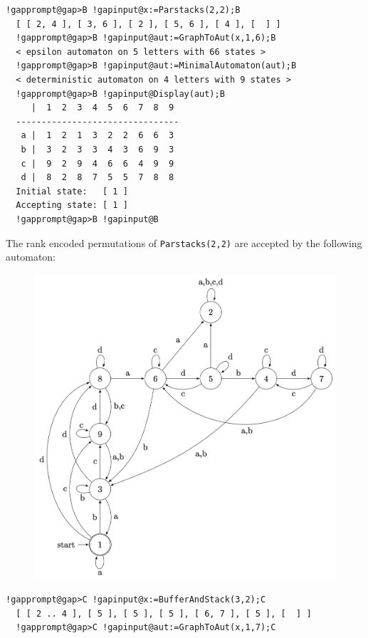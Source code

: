 \documentclass[a4paper,11pt]{report}
\begin{document}
{{{\begin{Verbatim}[commandchars=!@B,fontsize=\small,frame=single,label=Example]
  !gapprompt@gap>B !gapinput@x:=Parstacks(2,2);B
  [ [ 2, 4 ], [ 3, 6 ], [ 2 ], [ 5, 6 ], [ 4 ], [  ] ]
  !gapprompt@gap>B !gapinput@aut:=GraphToAut(x,1,6);B
  < epsilon automaton on 5 letters with 66 states >
  !gapprompt@gap>B !gapinput@aut:=MinimalAutomaton(aut);B
  < deterministic automaton on 4 letters with 9 states >
  !gapprompt@gap>B !gapinput@Display(aut);B
     |  1  2  3  4  5  6  7  8  9  
  --------------------------------
   a |  1  2  1  3  2  2  6  6  3  
   b |  3  2  3  3  4  3  6  9  3  
   c |  9  2  9  4  6  6  4  9  9  
   d |  8  2  8  7  5  5  7  8  8  
  Initial state:   [ 1 ]
  Accepting state: [ 1 ]
  !gapprompt@gap>B !gapinput@B
\end{Verbatim}
  The rank encoded permutations of \texttt{Parstacks(2,2)} are accepted by the following automaton: \begin{figure}[H] \begin{center}
\leavevmode \includegraphics[scale=0.75]{img/ps22aut.jpg} \end{center}
\end{figure}   
\begin{Verbatim}[commandchars=!@C,fontsize=\small,frame=single,label=Example]
  !gapprompt@gap>C !gapinput@x:=BufferAndStack(3,2);C
  [ [ 2 .. 4 ], [ 5 ], [ 5 ], [ 5 ], [ 6, 7 ], [ 5 ], [  ] ]
  !gapprompt@gap>C !gapinput@aut:=GraphToAut(x,1,7);C

\end{Verbatim}}}}
\end{document}
